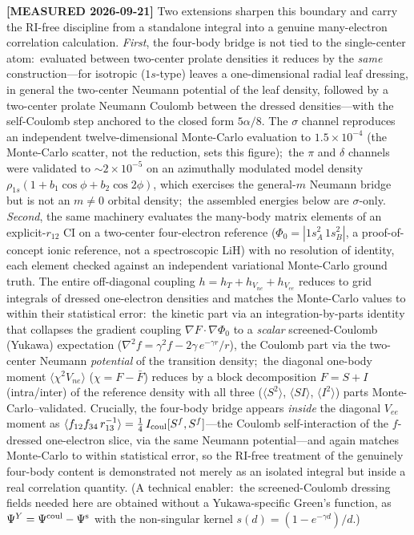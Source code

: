\documentclass[aps,pra,twocolumn,superscriptaddress,longbibliography]{revtex4-2}
\begin{document}
\textbf{[MEASURED 2026-09-21]} Two extensions sharpen this boundary and carry
the RI-free discipline from a standalone integral into a genuine many-electron
correlation calculation.  \emph{First}, the four-body bridge is not tied to the
single-center atom:\ evaluated between two-center prolate densities it reduces
by the \emph{same} construction---for isotropic ($1s$-type) leaves a
one-dimensional radial leaf dressing, in general the two-center Neumann
potential of the leaf density, followed by a two-center prolate Neumann Coulomb
between the dressed densities---with the self-Coulomb step anchored to the
closed form $5\alpha/8$.  The $\sigma$ channel reproduces an independent
twelve-dimensional Monte-Carlo evaluation to $1.5\times10^{-4}$ (the Monte-Carlo
scatter, not the reduction, sets this figure);\ the $\pi$ and $\delta$ channels
were validated to $\sim\!2\times10^{-5}$ on an azimuthally modulated model
density $\rho_{1s}(1+b_1\cos\phi+b_2\cos2\phi)$, which exercises the general-$m$
Neumann bridge but is not an $m\neq0$ orbital density;\ the assembled energies
below are $\sigma$-only.  \emph{Second}, the same machinery evaluates the many-body matrix
elements of an explicit-$r_{12}$ CI on a two-center four-electron reference
($\Phi_0=|1s_A^2\,1s_B^2|$, a proof-of-concept ionic reference, not a
spectroscopic LiH) with no resolution of identity, each element checked against
an independent variational Monte-Carlo ground truth.  The entire off-diagonal
coupling $h=h_T+h_{V_{ne}}+h_{V_{ee}}$ reduces to grid integrals of dressed
one-electron densities and matches the Monte-Carlo values to within their
statistical error:\ the kinetic part via an integration-by-parts identity that
collapses the gradient coupling $\nabla F\!\cdot\!\nabla\Phi_0$ to a
\emph{scalar} screened-Coulomb (Yukawa) expectation
($\nabla^2 f=\gamma^2 f-2\gamma\,e^{-\gamma r}/r$), the Coulomb part via the
two-center Neumann \emph{potential} of the transition density;\ the diagonal
one-body moment $\langle\chi^2 V_{ne}\rangle$ ($\chi=F-\bar F$) reduces by a
block decomposition $F=S+I$ (intra/inter) of the reference density with all
three ($\langle S^2\rangle$, $\langle SI\rangle$, $\langle I^2\rangle$) parts
Monte-Carlo--validated.  Crucially, the four-body bridge appears \emph{inside}
the diagonal $V_{ee}$ moment as
$\langle f_{12}f_{34}\,r_{13}^{-1}\rangle=\tfrac14\,I_{\rm coul}[S^f,S^f]$---the
Coulomb self-interaction of the $f$-dressed one-electron slice, via the same
Neumann potential---and again matches Monte-Carlo to within statistical error,
so the RI-free treatment of the genuinely four-body content is demonstrated not
merely as an isolated integral but inside a real correlation quantity.  (A
technical enabler:\ the screened-Coulomb dressing fields needed here are
obtained without a Yukawa-specific Green's function, as
$\Psi^Y=\Psi^{\rm coul}-\Psi^{\rm s}$ with the non-singular kernel
$s(d)=(1-e^{-\gamma d})/d$.)
\end{document}
